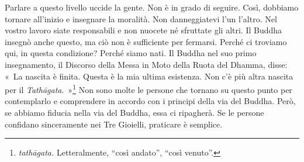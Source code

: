 Parlare a questo livello uccide la gente. Non è in grado di seguire.
Così, dobbiamo tornare all'inizio e insegnare la moralità. Non
danneggiatevi l'un l'altro. Nel vostro lavoro siate responsabili e non
nuocete né sfruttate gli altri. Il Buddha insegnò anche questo, ma ciò
non è sufficiente per fermarsi. Perché ci troviamo qui, in questa
condizione? Perché siamo nati. Il Buddha nel suo primo insegnamento, il
Discorso della Messa in Moto della Ruota del Dhamma, disse: «~La nascita
è finita. Questa è la mia ultima esistenza. Non c'è più altra nascita
per il \emph{Tathāgata}.~»\footnote{\emph{tathāgata.} Letteralmente,
  ``così andato'', ``così venuto''.} Non sono molte le persone che
tornano su questo punto per contemplarlo e comprendere in accordo con i
principi della via del Buddha. Però, se abbiamo fiducia nella via del
Buddha, essa ci ripagherà. Se le persone confidano sinceramente nei Tre
Gioielli, praticare è semplice.

